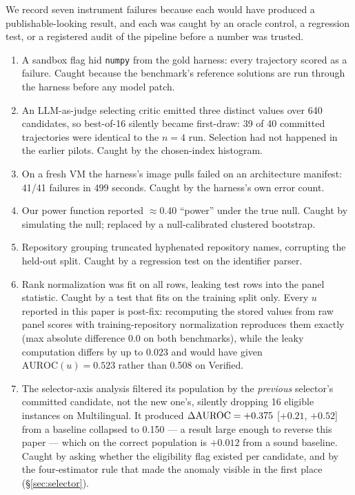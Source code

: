 \documentclass[11pt]{article}
\begin{document}
We record seven instrument failures because each would have produced a publishable-looking result, and each was caught by an oracle control, a regression test, or a registered audit of the pipeline before a number was trusted.
\begin{enumerate}[leftmargin=1.4em,itemsep=1pt]
\item A sandbox flag hid \texttt{numpy} from the gold harness: every trajectory scored as a failure. Caught because the benchmark's reference solutions are run through the harness before any model patch.
\item An LLM-as-judge selecting critic emitted three distinct values over 640 candidates, so best-of-16 silently became first-draw: 39 of 40 committed trajectories were identical to the $n{=}4$ run. Selection had not happened in the earlier pilots. Caught by the chosen-index histogram.
\item On a fresh VM the harness's image pulls failed on an architecture manifest: 41/41 failures in 499 seconds. Caught by the harness's own error count.
\item Our power function reported $\approx$0.40 ``power'' under the true null. Caught by simulating the null; replaced by a null-calibrated clustered bootstrap.
\item Repository grouping truncated hyphenated repository names, corrupting the held-out split. Caught by a regression test on the identifier parser.
\item Rank normalization was fit on all rows, leaking test rows into the panel statistic. Caught by a test that fits on the training split only. Every $u$ reported in this paper is post-fix: recomputing the stored values from raw panel scores with training-repository normalization reproduces them exactly (max absolute difference $0.0$ on both benchmarks), while the leaky computation differs by up to $0.023$ and would have given $\mathrm{AUROC}(u)=0.523$ rather than 0.508 on Verified.
\item The selector-axis analysis filtered its population by the \emph{previous} selector's committed candidate, not the new one's, silently dropping 16 eligible instances on Multilingual. It produced $\Delta\mathrm{AUROC} = +0.375$ [$+0.21$, $+0.52$] from a baseline collapsed to 0.150 --- a result large enough to reverse this paper --- which on the correct population is $+0.012$ from a sound baseline. Caught by asking whether the eligibility flag existed per candidate, and by the four-estimator rule that made the anomaly visible in the first place (\S\ref{sec:selector}).
\end{enumerate}
\end{document}
